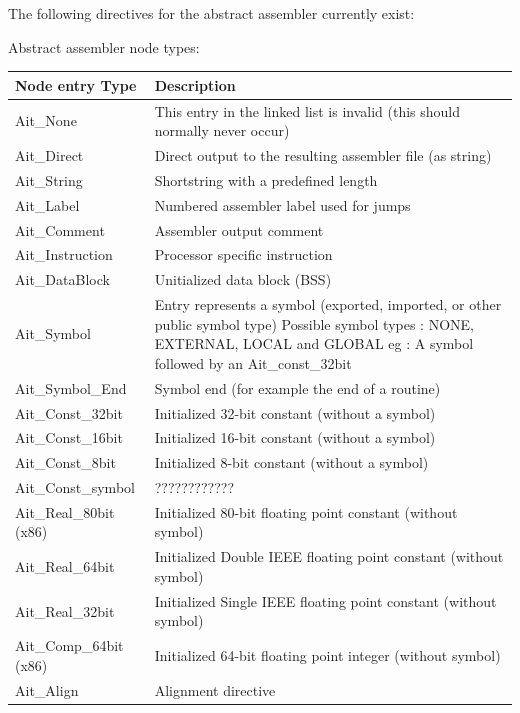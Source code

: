 \documentclass [a4paper,12pt]{article}
\begin{document}
The following directives for the abstract assembler currently exist:

Abstract assembler node types:

\begin{longtable}{|l|p{10cm}|}
\hline
Node entry Type   & Description \\
\hline
\endhead
\hline
\endfoot
Ait{\_}None&
    This entry in the linked list is invalid (this should
    normally never occur) \\
Ait{\_}Direct&
    Direct output to the resulting assembler file (as string) \\
Ait{\_}String&
    Shortstring with a predefined length \\
Ait{\_}Label&
    Numbered assembler label used for jumps \\
Ait{\_}Comment&
    Assembler output comment \\
Ait{\_}Instruction&
    Processor specific instruction \\
Ait{\_}DataBlock&
    Unitialized data block (BSS) \\
Ait{\_}Symbol&
    Entry represents a symbol (exported, imported, or other public
    symbol type) \newline
    Possible symbol types : NONE, EXTERNAL, LOCAL and GLOBAL \newline
    eg : A symbol followed by an Ait{\_}const{\_}32bit \\
Ait{\_}Symbol{\_}End &
    Symbol end (for example the end of a routine) \\
Ait{\_}Const{\_}32bit&
    Initialized 32-bit constant (without a symbol) \\
Ait{\_}Const{\_}16bit&
    Initialized 16-bit constant (without a symbol) \\
Ait{\_}Const{\_}8bit&
    Initialized 8-bit constant (without a symbol) \\
Ait{\_}Const{\_}symbol & ???????????? \\
Ait{\_}Real{\_}80bit (x86)&
    Initialized 80-bit floating point constant (without symbol) \\
Ait{\_}Real{\_}64bit&
    Initialized Double IEEE floating point constant (without symbol) \\
Ait{\_}Real{\_}32bit&
    Initialized Single IEEE floating point constant (without symbol) \\
Ait{\_}Comp{\_}64bit (x86)&
    Initialized 64-bit floating point integer (without symbol) \\
Ait{\_}Align&
    Alignment directive \\

\end{longtable}
\end{document}

